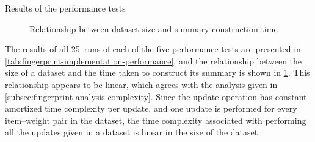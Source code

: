 \begin{table}
  \centering
  \caption{Results of the performance tests}
  \label{tab:fingerprint-implementation-performance}
\end{table}

\begin{figure}
  \centering
  \caption{Relationship between dataset size and summary construction time}
  \label{fig:fingerprint-implementation-performance}
\end{figure}

The results of all \num{25}~runs of each of the five performance tests are presented in \cref{tab:fingerprint-implementation-performance}, and the relationship between the size of a dataset and the time taken to construct its summary is shown in \cref{fig:fingerprint-implementation-performance}.
This relationship appears to be linear, which agrees with the analysis given in \cref{subsec:fingerprint-analysis-complexity}.
Since the update operation has constant amortized time complexity per update, and one update is performed for every item--weight pair in the dataset, the time complexity associated with performing all the updates given in a dataset is linear in the size of the dataset.
